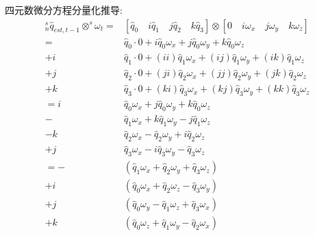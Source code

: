\documentclass[12pt,a4paper]{article}
\begin{document}
四元数微分方程分量化推导:
\begin{equation} \label{微分方程分量推导}
    \begin{aligned}
        {^s_n\hat{q}_{est,t-1}}\otimes^s\omega_t
        = &[\hat{q}_0\quad i\hat{q}_1\quad j\hat{q}_2\quad k\hat{q}_3] \otimes [0\quad i\omega_{x}\quad j\omega_{y}\quad k\omega_{z}] \\
        = & \hat{q}_0 \cdot 0 + i    \hat{q}_0 \omega_x + j    \hat{q}_0 \omega_y + k    \hat{q}_0 \omega_z \\
      + i & \hat{q}_1 \cdot 0 + (ii) \hat{q}_1 \omega_x + (ij) \hat{q}_1 \omega_y + (ik) \hat{q}_1 \omega_z \\
      + j & \hat{q}_2 \cdot 0 + (ji) \hat{q}_2 \omega_x + (jj) \hat{q}_2 \omega_y + (jk) \hat{q}_2 \omega_z \\
      + k & \hat{q}_3 \cdot 0 + (ki) \hat{q}_3 \omega_x + (kj) \hat{q}_3 \omega_y + (kk) \hat{q}_3 \omega_z \\
    =   i & \hat{q}_0 \omega_x + j \hat{q}_0 \omega_y + k \hat{q}_0 \omega_z \\
        - & \hat{q}_1 \omega_x + k \hat{q}_1 \omega_y - j \hat{q}_1 \omega_z \\
      - k & \hat{q}_2 \omega_x -   \hat{q}_2 \omega_y + i \hat{q}_2 \omega_z \\
        + j & \hat{q}_3 \omega_x - i \hat{q}_3 \omega_y -   \hat{q}_3 \omega_z \\
        = - & (\hat{q}_1 \omega_x + \hat{q}_2 \omega_y + \hat{q}_3 \omega_z) \\
        + i &(\hat{q}_0 \omega_x + \hat{q}_2 \omega_z - \hat{q}_3 \omega_y) \\
        + j & (\hat{q}_0 \omega_y - \hat{q}_1 \omega_z + \hat{q}_3 \omega_x) \\
        + k & (\hat{q}_0 \omega_z + \hat{q}_1 \omega_y - \hat{q}_2 \omega_x)
    \end{aligned}
\end{equation}
\end{document}
